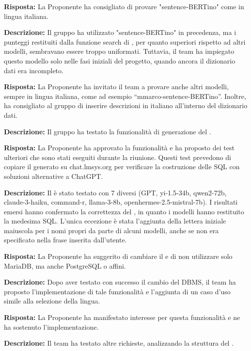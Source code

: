 \par \textbf{Risposta:} La Proponente ha consigliato di provare "sentence-BERTino" come  in lingua italiana.

\par \textbf{Descrizione:} Il gruppo ha utilizzato "sentence-BERTino" in precedenza, ma i punteggi restituiti dalla funzione search di , per quanto superiori rispetto ad altri modelli, sembravano essere troppo uniformati. Tuttavia, il team ha impiegato questo modello solo nelle fasi iniziali del progetto, quando ancora il dizionario dati era incompleto.
\par \textbf{Risposta:} La Proponente ha invitato il team a provare anche altri modelli, sempre in lingua italiana, come ad esempio “mmarco-sentence-BERTino”. Inoltre, ha consigliato al gruppo di inserire descrizioni in italiano all'interno del dizionario dati.

\par \textbf{Descrizione:} Il gruppo ha testato la funzionalità di generazione del .
\par \textbf{Risposta:} La Proponente ha approvato la funzionalità e ha proposto dei test ulteriori che sono stati eseguiti durante la riunione. Questi test prevedono di copiare il  generato su chat.lmsys.org per verificare la costruzione delle  SQL con soluzioni alternative a ChatGPT.
\par \textbf{Descrizione:} Il  è stato testato con 7  diversi (GPT, yi-1.5-34b, qwen2-72b, claude-3-haiku, command-r, llama-3-8b, openhermes-2.5-mistral-7b). I risultati emersi hanno confermato la correttezza del , in quanto i modelli hanno restituito la medesima  SQL. L'unica eccezione è stata l'aggiunta della lettera iniziale maiuscola per i nomi propri da parte di alcuni modelli, anche se non era specificato nella frase inserita dall'utente.

\par \textbf{Risposta:} La Proponente ha suggerito di cambiare il  e di non utilizzare solo MariaDB, ma anche PostgreSQL o affini.

\par \textbf{Descrizione:} Dopo aver testato con successo il cambio del DBMS, il team ha proposto l'implementazione di tale funzionalità e l'aggiunta di un caso d'uso simile alla selezione della lingua.

\par \textbf{Risposta:} La Proponente ha manifestato interesse per questa funzionalità e ne ha sostenuto l'implementazione.
\par \textbf{Descrizione:} Il team ha testato altre richieste, analizzando la struttura del .

